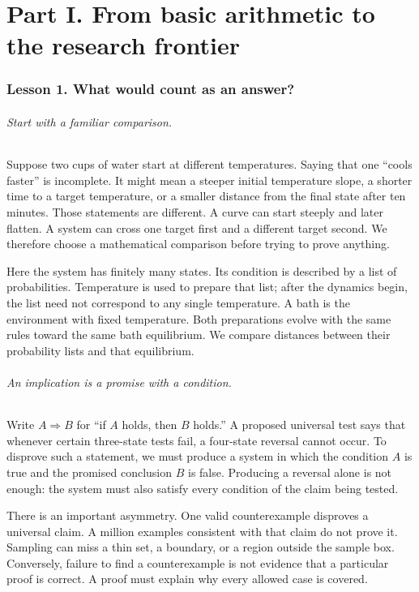 \documentclass[11pt]{article}
\begin{document}
\clearpage
\tableofcontents
\clearpage
\part*{Part I. From basic arithmetic to the research frontier}

\section*{Lesson 1. What would count as an answer?}
\paragraph{Start with a familiar comparison.}
Suppose two cups of water start at different temperatures. Saying that one
``cools faster'' is incomplete. It might mean a steeper initial temperature
slope, a shorter time to a target temperature, or a smaller distance from the
final state after ten minutes. Those statements are different. A curve can
start steeply and later flatten. A system can cross one target first and a
different target second. We therefore choose a mathematical comparison before
trying to prove anything.

Here the system has finitely many states. Its condition is described by a list
of probabilities. Temperature is used to prepare that list; after the dynamics
begin, the list need not correspond to any single temperature. A bath is the
environment with fixed temperature. Both preparations evolve with the same
rules toward the same bath equilibrium. We compare distances between their
probability lists and that equilibrium.

\paragraph{An implication is a promise with a condition.}
Write $A\Rightarrow B$ for ``if $A$ holds, then $B$ holds.'' A proposed universal
test says that whenever certain three-state tests fail, a four-state reversal
cannot occur. To disprove such a statement, we must produce a system in which
the condition $A$ is true and the promised conclusion $B$ is false. Producing a
reversal alone is not enough: the system must also satisfy every condition of
the claim being tested.

There is an important asymmetry. One valid counterexample disproves a universal
claim. A million examples consistent with that claim do not prove it. Sampling
can miss a thin set, a boundary, or a region outside the sample box. Conversely,
failure to find a counterexample is not evidence that a particular proof is
correct. A proof must explain why every allowed case is covered.
\end{document}
